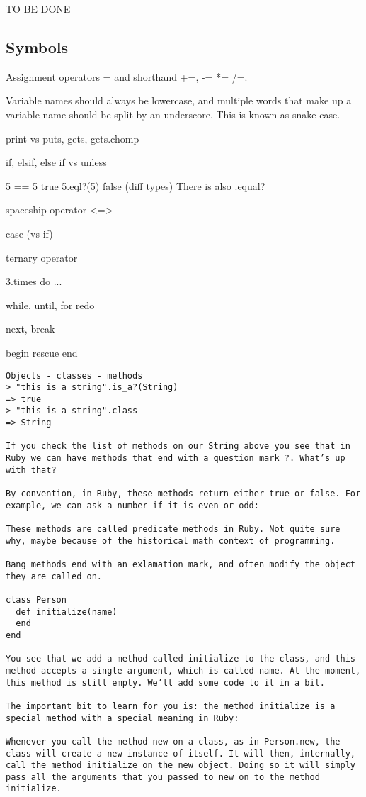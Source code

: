 \documentclass{a5charun}
\begin{document}
\begin{multicols*}{2}



TO BE DONE

\subsection{Symbols}


Assignment operators = and shorthand +=, -= *= /=.

Variable names should always be lowercase, and multiple words that make up a variable name should be split by an underscore. This is known as snake case.

print vs puts, gets, gets.chomp

if, elsif, else
if vs unless

5 == 5 true
5.eql?(5) false (diff types)
There is also .equal?

spaceship operator <=>

case (vs if)


ternary operator

3.times do ...

while, until, for
redo

next, break

begin rescue end



\begin{verbatim}
Objects - classes - methods
> "this is a string".is_a?(String)
=> true
> "this is a string".class
=> String

If you check the list of methods on our String above you see that in Ruby we can have methods that end with a question mark ?. What’s up with that?

By convention, in Ruby, these methods return either true or false. For example, we can ask a number if it is even or odd:

These methods are called predicate methods in Ruby. Not quite sure why, maybe because of the historical math context of programming.

Bang methods end with an exlamation mark, and often modify the object they are called on. 

class Person
  def initialize(name)
  end
end

You see that we add a method called initialize to the class, and this method accepts a single argument, which is called name. At the moment, this method is still empty. We’ll add some code to it in a bit.

The important bit to learn for you is: the method initialize is a special method with a special meaning in Ruby:

Whenever you call the method new on a class, as in Person.new, the class will create a new instance of itself. It will then, internally, call the method initialize on the new object. Doing so it will simply pass all the arguments that you passed to new on to the method initialize.
\end{verbatim}

\end{multicols*}
\end{document}
